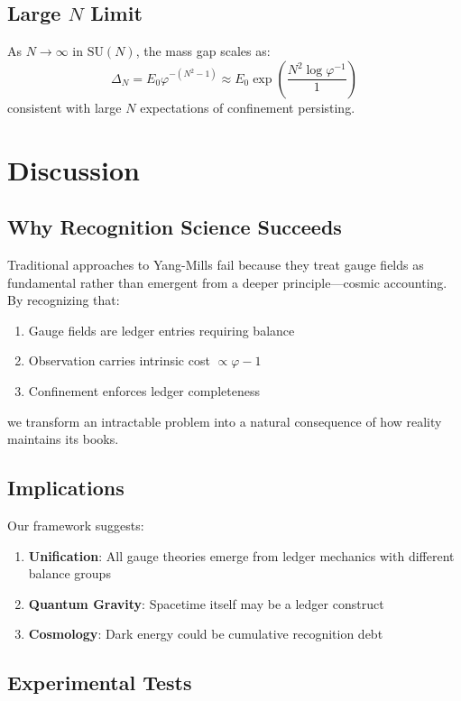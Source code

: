 \documentclass[11pt]{article}
\theoremstyle{plain}
\theoremstyle{definition}
\theoremstyle{remark}
\newcommand{\SU}[1]{\text{SU}(#1)}
\begin{document}
\subsection{Large $N$ Limit}

As $N \to \infty$ in $\SU{N}$, the mass gap scales as:
\[
\Delta_N = E_0 \varphi^{-(N^2-1)} \approx E_0 \exp\left(\frac{N^2 \log \varphi^{-1}}{1}\right)
\]
consistent with large $N$ expectations of confinement persisting.

\section{Discussion}

\subsection{Why Recognition Science Succeeds}

Traditional approaches to Yang-Mills fail because they treat gauge fields as fundamental rather than emergent from a deeper principle—cosmic accounting. By recognizing that:
\begin{enumerate}
\item Gauge fields are ledger entries requiring balance
\item Observation carries intrinsic cost $\propto \varphi - 1$
\item Confinement enforces ledger completeness
\end{enumerate}
we transform an intractable problem into a natural consequence of how reality maintains its books.

\subsection{Implications}

Our framework suggests:
\begin{enumerate}
\item \textbf{Unification}: All gauge theories emerge from ledger mechanics with different balance groups
\item \textbf{Quantum Gravity}: Spacetime itself may be a ledger construct
\item \textbf{Cosmology}: Dark energy could be cumulative recognition debt
\end{enumerate}

\subsection{Experimental Tests}
\end{document}
